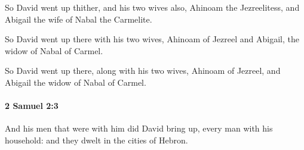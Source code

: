 			\begin{versebox}
					\item[BHS] 
					\item[ASV] So David went up thither, and his two wives also, Ahinoam the Jezreelitess, and Abigail the wife of Nabal the Carmelite.
					\item[NIV] So David went up there with his two wives, Ahinoam of Jezreel and Abigail, the widow of Nabal of Carmel.
					\item[NRSV] So David went up there, along with his two wives, Ahinoam of Jezreel, and Abigail the widow of Nabal of Carmel.
			\end{versebox}

		\paragraph{2 Samuel 2:3} %
			\label{2SAMUEL-2-3}

			And his men that were with him did David bring up, every man with his household: and they dwelt in the cities of Hebron.

